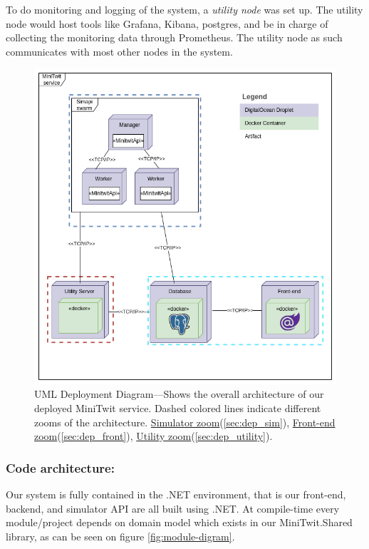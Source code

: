 
To do monitoring and logging of the system, a \textit{utility node} was set up. The utility node would host tools like Grafana, Kibana, postgres, and be in charge of collecting the monitoring data through Prometheus. The utility node as such communicates with most other nodes in the system.


\begin{figure}
    \centering
    \includegraphics[scale=0.4]{images/Deployment-meta.png}
    \caption{UML Deployment Diagram—Shows the overall architecture of our deployed MiniTwit service. Dashed colored lines indicate different zooms of the architecture.  \hyperref[sec:dep_sim]{Simulator zoom}(\ref{sec:dep_sim}),
     \hyperref[sec:dep_front]{Front-end zoom}(\ref{sec:dep_front}), \hyperref[sec:dep_utility]{Utility zoom}(\ref{sec:dep_utility}).}
    \label{fig:deploy-meta}
\end{figure}

\subsubsection{Code architecture:}
Our system is fully contained in the .NET environment, that is our front-end, backend, and simulator API are all built using .NET. 
At compile-time every module/project depends on domain model which exists in our MiniTwit.Shared library, as can be seen on figure \ref{fig:module-digram}. 

